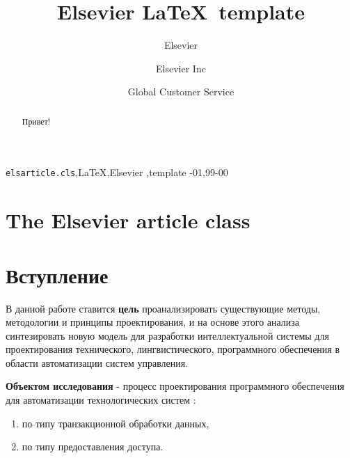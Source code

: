 \documentclass[review]{elsarticle}
\begin{document}
\begin{frontmatter}

\title{Elsevier \LaTeX\ template}

\author{Elsevier}
\address{Radarweg 29, Amsterdam}

\author[mymainaddress,mysecondaryaddress]{Elsevier Inc}

\author[mysecondaryaddress]{Global Customer Service}

\address[mymainaddress]{1600 John F Kennedy Boulevard, Philadelphia}
\address[mysecondaryaddress]{360 Park Avenue South, New York}

\begin{abstract}
Привет!
\end{abstract}

\begin{keyword}
\texttt{elsarticle.cls}\sep \LaTeX\sep Elsevier \sep template
-01\sep  99-00
\end{keyword}

\end{frontmatter}

\linenumbers

\section{The Elsevier article class}




\section{Вступление}


В данной работе ставится \textbf{цель} проанализировать существующие методы, методологии и принципы проектирования, и на основе этого анализа синтезировать новую модель для разработки интеллектуальной системы для проектирования технического, лингвистического, программного обеспечения в области автоматизации систем управления. 

\textbf{Объектом исследования} - процесс проектирования программного обеспечения для автоматизации технологических систем :
\begin{enumerate}
  \item по типу транзакционной обработки данных,
  \item по типу предоставления доступа.
\end{enumerate}
\end{document}
